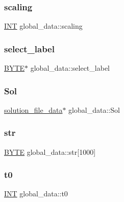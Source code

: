 \subsubsection{\texorpdfstring{scaling}{scaling}}
{\footnotesize\ttfamily \mbox{\hyperlink{galois_8h_a09fddde158a3a20bd2dcadb609de11dc}{I\+NT}} global\+\_\+data\+::scaling}

\mbox{\label{classglobal__data_a9cc5725eccd37b4aa0155d548b54594f}} 
\subsubsection{\texorpdfstring{select\+\_\+label}{select\_label}}
{\footnotesize\ttfamily \mbox{\hyperlink{galois_8h_ab6cc7b4aeb6ea31aba2b3fbfc83ff5e6}{B\+Y\+TE}}$\ast$ global\+\_\+data\+::select\+\_\+label}

\mbox{\label{classglobal__data_a70075fe9558aeb2a61da42510e148560}} 
\subsubsection{\texorpdfstring{Sol}{Sol}}
{\footnotesize\ttfamily \mbox{\hyperlink{structsolution__file__data}{solution\+\_\+file\+\_\+data}}$\ast$ global\+\_\+data\+::\+Sol}

\mbox{\label{classglobal__data_ac4e302ab9b7ad5a600b14738460cd866}} 
\subsubsection{\texorpdfstring{str}{str}}
{\footnotesize\ttfamily \mbox{\hyperlink{galois_8h_ab6cc7b4aeb6ea31aba2b3fbfc83ff5e6}{B\+Y\+TE}} global\+\_\+data\+::str\mbox{[}1000\mbox{]}}

\mbox{\label{classglobal__data_a1669e5560a4db9e4daeddd5ed525f15c}} 
\subsubsection{\texorpdfstring{t0}{t0}}
{\footnotesize\ttfamily \mbox{\hyperlink{galois_8h_a09fddde158a3a20bd2dcadb609de11dc}{I\+NT}} global\+\_\+data\+::t0}

